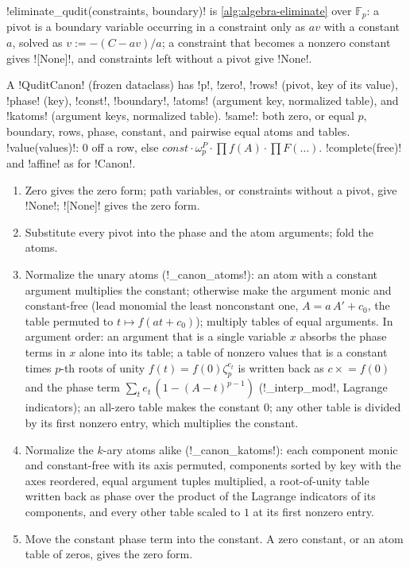 \py!eliminate_qudit(constraints, boundary)! is \cref{alg:algebra-eliminate} over $\mathbb{F}_p$: a pivot is a boundary variable occurring in a constraint only as $av$ with a constant $a$, solved as $v:=-(C-av)/a$; a constraint that becomes a nonzero constant gives \py![None]!, and constraints left without a pivot give \py!None!.

\begin{definition}\label{def:algebra-qudit-canon}
A \py!QuditCanon! (frozen dataclass) has \py!p!, \py!zero!, \py!rows! (pivot, key of its value), \py!phase! (key), \py!const!, \py!boundary!, \py!atoms! (argument key, normalized table), and \py!katoms! (argument keys, normalized table). \py!same!: both zero, or equal $p$, boundary, rows, phase, constant, and pairwise equal atoms and tables. \py!value(values)!: $0$ off a row, else $\mathit{const}\cdot\omega_p^{P}\cdot\prod f(A)\cdot\prod F(\ldots)$. \py!complete(free)! and \py!affine! as for \py!Canon!.
\end{definition}

\begin{algorithm}\label{alg:algebra-canonical-qudit}
\begin{enumerate}
\item Zero gives the zero form; path variables, or constraints without a pivot, give \py!None!; \py![None]! gives the zero form.
\item Substitute every pivot into the phase and the atom arguments; fold the atoms.
\item Normalize the unary atoms (\py!_canon_atoms!): an atom with a constant argument multiplies the constant; otherwise make the argument monic and constant-free (lead monomial the least nonconstant one, $A=a\,A'+c_0$, the table permuted to $t\mapsto f(at+c_0)$); multiply tables of equal arguments. In argument order: an argument that is a single variable $x$ absorbs the phase terms in $x$ alone into its table; a table of nonzero values that is a constant times $p$-th roots of unity $f(t)=f(0)\zeta_p^{e_t}$ is written back as $c\mathrel{\times}=f(0)$ and the phase term $\sum_te_t\,(1-(A-t)^{p-1})$ (\py!_interp_mod!, Lagrange indicators); an all-zero table makes the constant $0$; any other table is divided by its first nonzero entry, which multiplies the constant.
\item Normalize the $k$-ary atoms alike (\py!_canon_katoms!): each component monic and constant-free with its axis permuted, components sorted by key with the axes reordered, equal argument tuples multiplied, a root-of-unity table written back as phase over the product of the Lagrange indicators of its components, and every other table scaled to $1$ at its first nonzero entry.
\item Move the constant phase term into the constant. A zero constant, or an atom table of zeros, gives the zero form.
\end{enumerate}
\end{algorithm}


